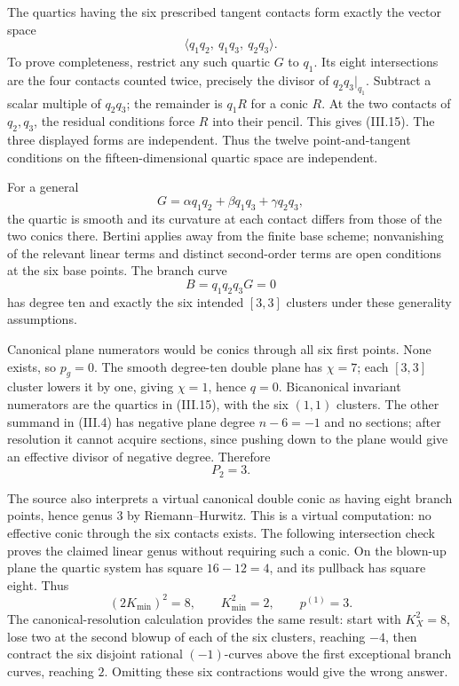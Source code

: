 The quartics having the six prescribed tangent contacts form exactly the vector space \[
\langle q_1q_2,\ q_1q_3,\ q_2q_3\rangle.
\tag{III.15}
\] To prove completeness, restrict any such quartic \(G\) to \(q_1\). Its eight intersections are the four contacts counted twice, precisely the divisor of \(q_2q_3|_{q_1}\). Subtract a scalar multiple of \(q_2q_3\); the remainder is \(q_1R\) for a conic \(R\). At the two contacts of \(q_2,q_3\), the residual conditions force \(R\) into their pencil. This gives (III.15). The three displayed forms are independent. Thus the twelve point-and-tangent conditions on the fifteen-dimensional quartic space are independent.

For a general \[
G=\alpha q_1q_2+\beta q_1q_3+\gamma q_2q_3,
\] the quartic is smooth and its curvature at each contact differs from those of the two conics there. Bertini applies away from the finite base scheme; nonvanishing of the relevant linear terms and distinct second-order terms are open conditions at the six base points. The branch curve \[
B=q_1q_2q_3G=0
\] has degree ten and exactly the six intended \([3,3]\) clusters under these generality assumptions.

Canonical plane numerators would be conics through all six first points. None exists, so \(p_g=0\). The smooth degree-ten double plane has \(\chi=7\); each \([3,3]\) cluster lowers it by one, giving \(\chi=1\), hence \(q=0\). Bicanonical invariant numerators are the quartics in (III.15), with the six \((1,1)\) clusters. The other summand in (III.4) has negative plane degree \(n-6=-1\) and no sections; after resolution it cannot acquire sections, since pushing down to the plane would give an effective divisor of negative degree. Therefore \[
P_2=3.
\tag{III.16}
\]

The source also interprets a virtual canonical double conic as having eight branch points, hence genus \(3\) by Riemann--Hurwitz. This is a virtual computation: no effective conic through the six contacts exists. The following intersection check proves the claimed linear genus without requiring such a conic. On the blown-up plane the quartic system has square \(16-12=4\), and its pullback has square eight. Thus \[
(2K_{\min})^2=8,\qquad K_{\min}^2=2,\qquad p^{(1)}=3.
\] The canonical-resolution calculation provides the same result: start with \(K_X^2=8\), lose two at the second blowup of each of the six clusters, reaching \(-4\), then contract the six disjoint rational \((-1)\)-curves above the first exceptional branch curves, reaching \(2\). Omitting these six contractions would give the wrong answer.

